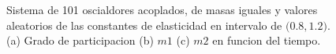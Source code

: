 \documentclass[11pt,letterpaper,twocolumn]{article}
\begin{document}
\begin{figure}[h!]
\begin{center}
\caption{Sistema de 101 oscialdores acoplados, de masas iguales y valores aleatorios de las constantes de elasticidad en intervalo de $(0$.$8,1$.$2)$. (a) Grado de participacion (b) $m1$ (c) $m2$ en funcion del tiempo.}
\end{center}
\end{figure}

\begin{figure}[h!]
\begin{center}

\end{center}
\end{figure}
\end{document}

